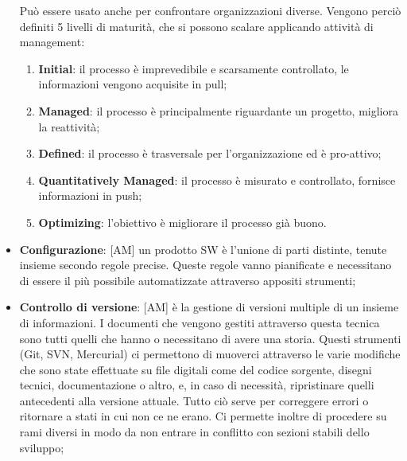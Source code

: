 \begin{itemize}
		Può essere usato anche per confrontare organizzazioni diverse. \newline
		Vengono perciò definiti 5 livelli di maturità, che si possono scalare applicando attività di management:
			\begin{enumerate}
				\item \textbf{Initial}: il processo è imprevedibile e scarsamente controllato, le informazioni vengono acquisite in pull;
				\item \textbf{Managed}: il processo è principalmente riguardante un progetto, migliora la reattività;
				\item \textbf{Defined}: il processo è trasversale per l'organizzazione ed è pro-attivo;
				\item \textbf{Quantitatively Managed}: il processo è misurato e controllato, fornisce informazioni in push;
				\item \textbf{Optimizing}: l'obiettivo è migliorare il processo già buono.
			\end{enumerate}
		\item \textbf{Configurazione}: [AM] un prodotto SW è l'unione di parti distinte, tenute insieme secondo regole precise. Queste regole vanno pianificate e necessitano di essere il più possibile automatizzate attraverso appositi strumenti;
		\item \textbf{Controllo di versione}: [AM]  è la gestione di versioni multiple di un insieme di informazioni. I documenti che vengono gestiti attraverso questa tecnica sono tutti quelli che hanno o necessitano di avere una storia.\newline
	Questi strumenti (Git, SVN, Mercurial) ci permettono di muoverci attraverso le varie modifiche che sono state effettuate su file digitali come del codice sorgente, disegni tecnici, documentazione o altro, e, in caso di necessità, ripristinare quelli antecedenti alla versione attuale. \newline
	Tutto ciò serve per correggere errori o ritornare a stati in cui non ce ne erano. Ci permette inoltre di procedere su rami diversi in modo da non entrare in conflitto con sezioni stabili dello sviluppo;

	\end{itemize}